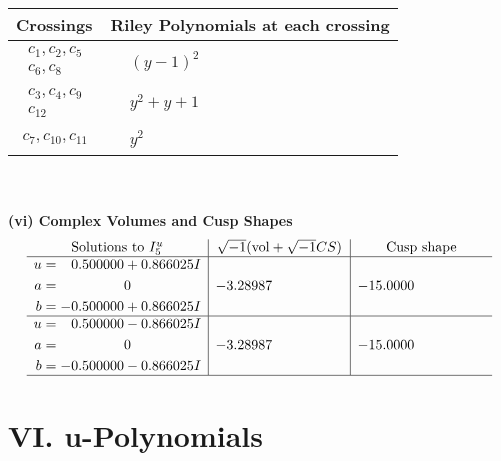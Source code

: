 \documentclass[1p]{elsarticle_modified}
\theoremstyle{definition}
\newcommand{\I}{\sqrt{-1}}
\begin{document}
\begin{tabular}{m{50pt}|m{274pt}}
Crossings & \hspace{64pt}Riley Polynomials at each crossing \\
\hline $$\begin{aligned}c_{1},c_{2},c_{5}\\c_{6},c_{8}\end{aligned}$$&$\begin{aligned}
&(y-1)^2
\end{aligned}$\\
\hline $$\begin{aligned}c_{3},c_{4},c_{9}\\c_{12}\end{aligned}$$&$\begin{aligned}
&y^2+y+1
\end{aligned}$\\
\hline $$\begin{aligned}c_{7},c_{10},c_{11}\end{aligned}$$&$\begin{aligned}
&y^2
\end{aligned}$\\
\hline
\end{tabular}\\~\\
\newpage\flushleft \textbf{(vi) Complex Volumes and Cusp Shapes}
$$\begin{array}{c|c|c}  
\text{Solutions to }I^u_{5}& \I (\text{vol} + \sqrt{-1}CS) & \text{Cusp shape}\\
 \hline 
\begin{aligned}
u &= \phantom{-}0.500000 + 0.866025 I \\
a &= \phantom{-0.000000 } 0 \\
b &= -0.500000 + 0.866025 I\end{aligned}
 & -3.28987\phantom{ +0.000000I} & -15.0000\phantom{ +0.000000I} \\ \hline\begin{aligned}
u &= \phantom{-}0.500000 - 0.866025 I \\
a &= \phantom{-0.000000 } 0 \\
b &= -0.500000 - 0.866025 I\end{aligned}
 & -3.28987\phantom{ +0.000000I} & -15.0000\phantom{ +0.000000I}\\
 \hline 
 \end{array}$$\newpage
\newpage\renewcommand{\arraystretch}{1}
\centering \section*{ VI. u-Polynomials}
\end{document}
